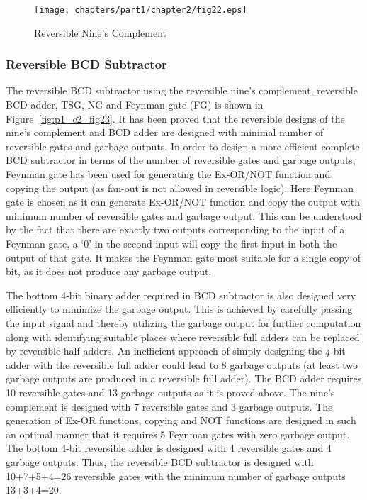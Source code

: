 \begin{figure}[!tbh]
	\centering
	\texttt{[image: chapters/part1/chapter2/fig22.eps]}
	\caption{Reversible Nine's Complement}
	\label{fig:p1_c2_fig22}
\end{figure}

\subsubsection{Reversible BCD Subtractor}
The reversible BCD subtractor using the reversible nine's complement, reversible BCD adder, TSG, NG  and Feynman gate (FG) is shown in Figure~\ref{fig:p1_c2_fig23}. It has been proved that the reversible designs of the nine's complement and BCD adder are designed with minimal number of reversible gates and garbage outputs. In order to design a more efficient complete BCD subtractor in terms of the number of reversible gates and garbage outputs, Feynman gate has been used for generating the Ex-OR/NOT function and copying the output (as fan-out is not allowed in reversible logic). Here Feynman gate is chosen as it can generate Ex-OR/NOT function and copy the output with minimum number of reversible gates and garbage output. This can be understood by the fact that there are exactly two outputs corresponding to the input of a Feynman gate, a `0' in the second input will copy the first input in both the output of that gate. It makes the Feynman gate most suitable for a single copy of bit, as it does not produce any garbage output.


The bottom {4}-bit binary adder required in BCD subtractor is also designed very efficiently to minimize the garbage output. This is achieved by carefully passing the input signal and thereby utilizing the garbage output for further computation along with identifying suitable places where reversible full adders can be replaced by reversible half adders. An inefficient approach of simply designing the \textit{4}-bit adder with the reversible full adder could lead to 8 garbage outputs (at least two garbage outputs are produced in a reversible full adder). The BCD adder requires 10 reversible gates and 13 garbage outputs as it is proved above. The nine's complement is designed with 7 reversible gates and 3 garbage outputs. The generation of Ex-OR functions, copying and NOT functions are designed in such an optimal manner that it requires 5 Feynman gates with zero garbage output. The bottom {4}-bit reversible adder is designed with 4 reversible gates and 4 garbage outputs. Thus, the reversible BCD subtractor is designed with 10+7+5+4=26 reversible gates with the minimum number of garbage outputs 13+3+4=20.

